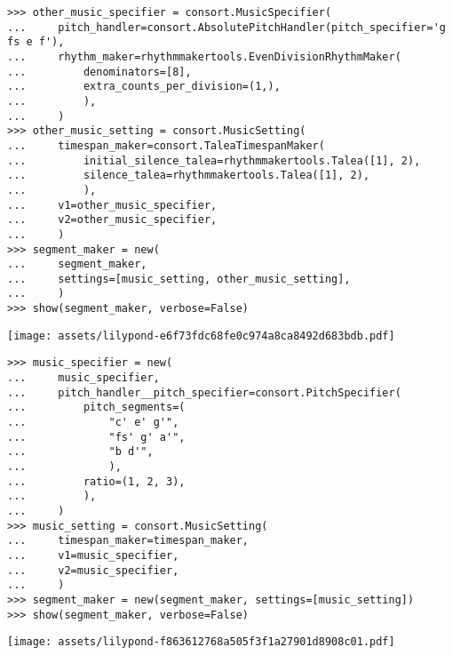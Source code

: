 \begin{abjadbookoutput}
\begin{singlespacing}
\vspace{-0.5\baselineskip}
\begin{lstlisting}
>>> other_music_specifier = consort.MusicSpecifier(
...     pitch_handler=consort.AbsolutePitchHandler(pitch_specifier='g fs e f'),
...     rhythm_maker=rhythmmakertools.EvenDivisionRhythmMaker(
...         denominators=[8],
...         extra_counts_per_division=(1,),
...         ),
...     )
>>> other_music_setting = consort.MusicSetting(
...     timespan_maker=consort.TaleaTimespanMaker(
...         initial_silence_talea=rhythmmakertools.Talea([1], 2),
...         silence_talea=rhythmmakertools.Talea([1], 2),
...         ),
...     v1=other_music_specifier,
...     v2=other_music_specifier,
...     )
>>> segment_maker = new(
...     segment_maker,
...     settings=[music_setting, other_music_setting],
...     )
>>> show(segment_maker, verbose=False)
\end{lstlisting}
\noindent\texttt{[image: assets/lilypond-e6f73fdc68fe0c974a8ca8492d683bdb.pdf]}
\end{singlespacing}
\end{abjadbookoutput}

\begin{comment}
<abjad>[stylesheet=../consort.ily]
music_specifier = new(
    music_specifier,
    pitch_handler__pitch_specifier=consort.PitchSpecifier(
        pitch_segments=(
            "c' e' g'",
            "fs' g' a'",
            "b d'",
            ),
        ratio=(1, 2, 3),
        ),
    )
music_setting = consort.MusicSetting(
    timespan_maker=timespan_maker,
    v1=music_specifier,
    v2=music_specifier,
    )
segment_maker = new(segment_maker, settings=[music_setting])
show(segment_maker, verbose=False)
</abjad>
\end{comment}

\begin{abjadbookoutput}
\begin{singlespacing}
\vspace{-0.5\baselineskip}
\begin{lstlisting}
>>> music_specifier = new(
...     music_specifier,
...     pitch_handler__pitch_specifier=consort.PitchSpecifier(
...         pitch_segments=(
...             "c' e' g'",
...             "fs' g' a'",
...             "b d'",
...             ),
...         ratio=(1, 2, 3),
...         ),
...     )
>>> music_setting = consort.MusicSetting(
...     timespan_maker=timespan_maker,
...     v1=music_specifier,
...     v2=music_specifier,
...     )
>>> segment_maker = new(segment_maker, settings=[music_setting])
>>> show(segment_maker, verbose=False)
\end{lstlisting}
\noindent\texttt{[image: assets/lilypond-f863612768a505f3f1a27901d8908c01.pdf]}
\end{singlespacing}
\end{abjadbookoutput}

